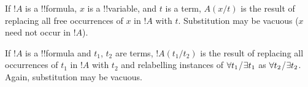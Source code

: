 \documentclass[../../include/open-logic-section]{subfiles}
\begin{document}



\begin{defn}
If $!A$ is a !!{formula}, $x$ is a !!{variable}, and $t$ is a term, $A(x/t)$
is the result of replacing all free occurrences of $x$ in $!A$ with
$t$. Substitution may be vacuous ($x$ need not occur in $!A$).
\end{defn}

\begin{defn}
If $!A$ is a !!{formula} and $t_1$, $t_2$ are terms, $!A(t_1/t_2)$ is
the result of replacing all occurrences of $t_1$ in $!A$ with $t_2$
and relabelling instances of $\lforall[t_1]$/$\lexists[t_1]$ as
$\lforall[t_2]$/$\lexists[t_2]$. Again, substitution may be vacuous.
\end{defn}
\end{document}

